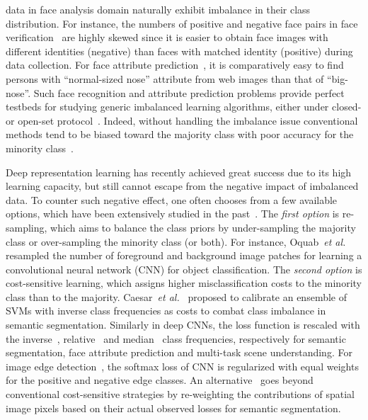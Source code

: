 \documentclass[10pt,journal,compsoc]{IEEEtran}
\newcommand{\etal}{\emph{et al.}}
\newcommand{\eg}{\emph{e.g.}}
\begin{document}

 data in face analysis domain naturally exhibit imbalance in their class distribution. For instance, the numbers of positive and negative face pairs in face verification~\cite{LFWTech,kemelmacher2016megaface} are highly skewed since it is easier to obtain face images with different identities (negative) than faces with matched identity (positive) during data collection. For face attribute prediction~\cite{kumar2011describable}, it is comparatively easy to find persons with ``normal-sized nose'' attribute from web images than that of ``big-nose''. Such face recognition and attribute prediction problems provide perfect testbeds for studying generic imbalanced learning algorithms, either under closed- or open-set protocol~\cite{Taigman14}. Indeed, without handling the imbalance issue conventional methods tend to be biased toward the majority class with poor accuracy for the minority class~\cite{He09,He2013}.

Deep representation learning has recently achieved great success due to its high learning capacity, but still cannot escape from the negative impact of imbalanced data. To counter such negative effect, one often chooses from a few available options, which have been extensively studied in the past~\cite{He2013,Chawla02,KRAWCZYK2014554,Drummond03,Han05,He09,Maciejewski11,Tang09,Ting00,Chen16,He08adasyn,Zhou2006AAAI}. The \textit{first option} is re-sampling, which aims to balance the class priors by under-sampling the majority class or over-sampling the minority class (or both). For instance, Oquab~\etal~\cite{oquab2014learning} resampled the number of foreground and background image patches for learning a convolutional neural network (CNN) for object classification. The \textit{second option} is cost-sensitive learning, which assigns higher misclassification costs to the minority class than to the majority. Caesar~\etal~\cite{CaesarUF15} proposed to calibrate an ensemble of SVMs with inverse class frequencies as costs to combat class imbalance in semantic segmentation. Similarly in deep CNNs, the loss function is rescaled with the inverse~\cite{MostajabiYS15}, relative~\cite{Rudd2016} and median~\cite{Eigen2015} class frequencies, respectively for semantic segmentation, face attribute prediction and multi-task scene understanding. For image edge detection~\cite{Shen15}, the softmax loss of CNN is regularized with equal weights for the positive and negative edge classes. An alternative~\cite{BuloNK17} goes beyond conventional cost-sensitive strategies by re-weighting the contributions of spatial image pixels based on their actual observed losses for semantic segmentation.
\end{document}
